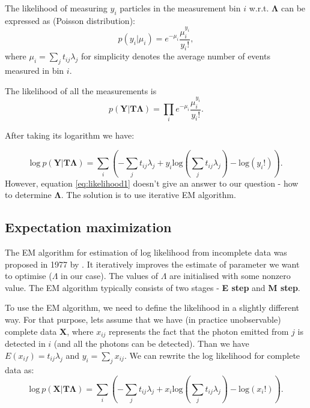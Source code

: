 The likelihood of measuring $y_{i}$ particles in the measurement bin $i$ w.r.t. $\mathbf{\Lambda}$ can be expressed as (Poisson distribution):
\begin{equation}
  p(y_{i} |\mu_{i} ) = e^{-\mu_{i}} \frac{\mu_{i}^{y_i}}{y_{i}!},
\end{equation}
where $\mu_{i} = \sum_{j} t_{ij}\lambda_{j}$ for simplicity denotes the average number of events measured in bin $i$.

The likelihood of all the measurements is
\begin{equation}  
  p(\mathbf{Y} | \mathbf{T\Lambda} ) = \prod_{i} e^{-\mu_{i}} \frac{\mu_{i}^{y_i}}{y_{i}!}.
\end{equation}

After taking its logarithm we have:

\begin{equation}  
  \mathrm{log}\ p(\mathbf{Y} | \mathbf{T\Lambda} ) = \sum_{i}\left ( -\sum_{j} t_{ij}\lambda_{j} + y_{i} \mathrm{log}(\sum_{j} t_{ij}\lambda_{j})  - \mathrm{log}(y_{i}!) \right ).
  \label{eq:likelihood1}
\end{equation}
However, equation \ref{eq:likelihood1} doesn't give an answer to our question - how to determine $\mathbf{\Lambda}$. The solution is to use iterative EM algorithm.

\subsection{Expectation maximization}
The EM algorithm for estimation of log likelihood from incomplete data was proposed in 1977 by \cite{EM}.
It iteratively improves the estimate of parameter we want to optimise ($\Lambda$ in our case).
The values of $\Lambda$ are initialised with some nonzero value.
The EM algorithm typically consists of two stages - \textbf{E step} and \textbf{M step}.

To use the EM algorithm, we need to define the likelihood in a slightly different way.
For that purpose, lets assume that we have (in practice unobservable) complete data $\mathbf{X}$, where $x_{ij}$ represents the fact that the photon emitted from $j$ is detected in $i$ (and all the photons can be detected).
Than we have $E(x_{if}) = t_{ij}\lambda_{j}$ and $y_{i} = \sum_{j}x_{ij}$. 
We can rewrite the log likelihood for complete data as:
\begin{equation}  
  \mathrm{log}\ p(\mathbf{X} | \mathbf{T\Lambda} ) = \sum_{i}\left ( -\sum_{j} t_{ij}\lambda_{j} + x_{i} \mathrm{log}(\sum_{j} t_{ij}\lambda_{j})  - \mathrm{log}(x_{i}!) \right ).
  \label{eq:likelihood2}
\end{equation}

